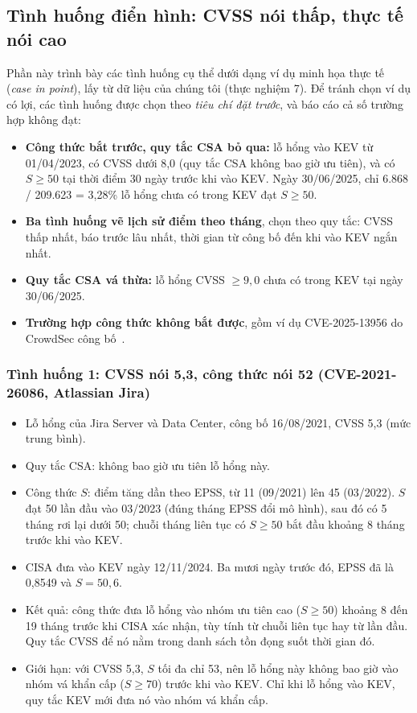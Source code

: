 \documentclass[conference]{IEEEtran}
\begin{document}
\subsection{Tình huống điển hình: CVSS nói thấp, thực tế nói cao}\label{sec:tinhhuong}

Phần này trình bày các tình huống cụ thể dưới dạng ví dụ minh họa thực tế (\emph{case in point}), lấy từ
dữ liệu của chúng tôi (thực nghiệm 7). Để tránh chọn ví dụ có lợi, các tình huống được chọn theo \emph{tiêu chí
đặt trước}, và báo cáo cả số trường hợp không đạt:
\begin{itemize}
\item \textbf{Công thức bắt trước, quy tắc CSA bỏ qua:} lỗ hổng vào KEV từ 01/04/2023, có CVSS dưới 8,0 (quy
tắc CSA không bao giờ ưu tiên), và có $S \ge 50$ tại thời điểm 30 ngày trước khi vào KEV. Ngày 30/06/2025, chỉ
6.868 / 209.623 = 3,28\% lỗ hổng chưa có trong KEV đạt $S \ge 50$.
\item \textbf{Ba tình huống vẽ lịch sử điểm theo tháng}, chọn theo quy tắc: CVSS thấp nhất, báo trước lâu nhất,
thời gian từ công bố đến khi vào KEV ngắn nhất.
\item \textbf{Quy tắc CSA vá thừa:} lỗ hổng CVSS $\ge 9{,}0$ chưa có trong KEV tại ngày 30/06/2025.
\item \textbf{Trường hợp công thức không bắt được}, gồm ví dụ CVE-2025-13956 do CrowdSec công bố~\cite{crowdsec2026}.
\end{itemize}

\subsubsection{Tình huống 1: CVSS nói 5,3, công thức nói 52 (CVE-2021-26086, Atlassian Jira)}
\begin{itemize}
\item Lỗ hổng của Jira Server và Data Center, công bố 16/08/2021, CVSS 5,3 (mức trung bình).
\item Quy tắc CSA: không bao giờ ưu tiên lỗ hổng này.
\item Công thức $S$: điểm tăng dần theo EPSS, từ 11 (09/2021) lên 45 (03/2022). $S$ đạt 50 lần đầu vào
03/2023 (đúng tháng EPSS đổi mô hình), sau đó có 5 tháng rơi lại dưới 50; chuỗi tháng liên tục có $S \ge 50$ bắt đầu khoảng
8 tháng trước khi vào KEV.
\item CISA đưa vào KEV ngày 12/11/2024. Ba mươi ngày trước đó, EPSS đã là 0,8549 và $S = 50{,}6$.
\item Kết quả: công thức đưa lỗ hổng vào nhóm ưu tiên cao ($S \ge 50$) khoảng 8 đến 19 tháng trước khi CISA
xác nhận, tùy tính từ chuỗi liên tục hay từ lần đầu. Quy tắc CVSS để nó nằm trong danh sách tồn đọng suốt thời
gian đó.
\item Giới hạn: với CVSS 5,3, $S$ tối đa chỉ 53, nên lỗ hổng này không bao giờ vào nhóm vá khẩn cấp
($S \ge 70$) trước khi vào KEV. Chỉ khi lỗ hổng vào KEV, quy tắc KEV mới đưa nó vào nhóm vá khẩn cấp.
\end{itemize}
\end{document}
